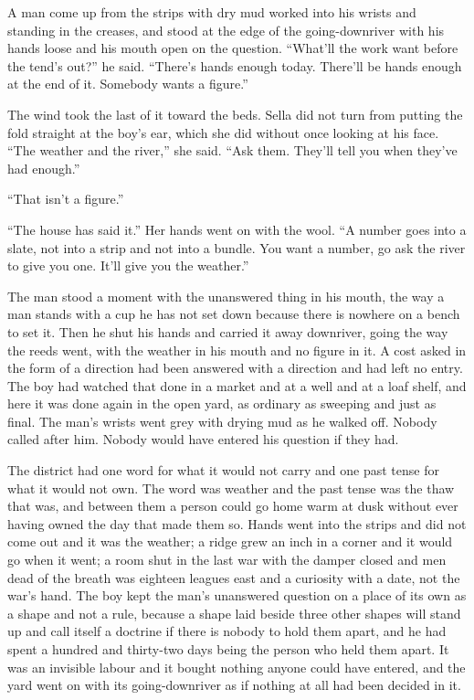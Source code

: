 \scenebreak

A man come up from the strips with dry mud worked into his wrists and standing in the creases, and stood at the edge of the going-downriver with his hands loose and his mouth open on the question. “What'll the work want before the tend's out?” he said. “There's hands enough today. There'll be hands enough at the end of it. Somebody wants a figure.”

The wind took the last of it toward the beds. Sella did not turn from putting the fold straight at the boy's ear, which she did without once looking at his face. “The weather and the river,” she said. “Ask them. They'll tell you when they've had enough.”

“That isn't a figure.”

“The house has said it.” Her hands went on with the wool. “A number goes into a slate, not into a strip and not into a bundle. You want a number, go ask the river to give you one. It'll give you the weather.”

The man stood a moment with the unanswered thing in his mouth, the way a man stands with a cup he has not set down because there is nowhere on a bench to set it. Then he shut his hands and carried it away downriver, going the way the reeds went, with the weather in his mouth and no figure in it. A cost asked in the form of a direction had been answered with a direction and had left no entry. The boy had watched that done in a market and at a well and at a loaf shelf, and here it was done again in the open yard, as ordinary as sweeping and just as final. The man's wrists went grey with drying mud as he walked off. Nobody called after him. Nobody would have entered his question if they had.

The district had one word for what it would not carry and one past tense for what it would not own. The word was weather and the past tense was the thaw that was, and between them a person could go home warm at dusk without ever having owned the day that made them so. Hands went into the strips and did not come out and it was the weather; a ridge grew an inch in a corner and it would go when it went; a room shut in the last war with the damper closed and men dead of the breath was eighteen leagues east and a curiosity with a date, not the war's hand. The boy kept the man's unanswered question on a place of its own as a shape and not a rule, because a shape laid beside three other shapes will stand up and call itself a doctrine if there is nobody to hold them apart, and he had spent a hundred and thirty-two days being the person who held them apart. It was an invisible labour and it bought nothing anyone could have entered, and the yard went on with its going-downriver as if nothing at all had been decided in it.

